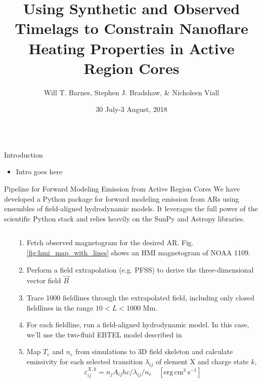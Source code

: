 \documentclass[final,12pt]{beamer}
\title[]{Using Synthetic and Observed Timelags to Constrain Nanoflare\\ Heating Properties in Active Region Cores}
\author[Barnes, Bradshaw, \& Viall]{Will T. Barnes\inst{1}, Stephen J. Bradshaw\inst{1}, \& Nicholeen Viall\inst{2}}
\institute[]{\inst{1} Department of Physics and Astronomy, Rice University \inst{2} NASA Goddard Space Flight Center}
\date{30 July-3 August, 2018}
\begin{document}
\begin{frame}
  \begin{columns}[T]
  \hfill
  \begin{column}{0.49\linewidth}
    \begin{block}{Introduction}
    \begin{itemize}
      \item Intro goes here
    \end{itemize}
    \end{block}
    \begin{block}{Pipeline for Forward Modeling Emission from Active Region Cores}
    We have developed a Python package for forward modeling emission from ARs using ensembles of field-aligned hydrodynamic models. It leverages the full power of the scientific Python stack and relies heavily on the SunPy \citep{sunpy_community_sunpypython_2015} and Astropy \citep{astropy_collaboration_astropy:_2013} libraries.
      \begin{columns}[T]
      \begin{column}{0.39\columnwidth}
      \end{column}
      \begin{column}{0.59\columnwidth}
        \begin{enumerate}
          \item Fetch observed magnetogram for the desired AR. Fig. \ref{fig:hmi_map_with_lines} shows an HMI magnetogram of NOAA 1109. 
          \item Perform a field extrapolation (e.g. PFSS) to derive the three-dimensional vector field $\vec{B}$
          \item Trace 1000 fieldlines through the extrapolated field, including only closed fieldlines in the range $10<L<1000$ Mm.
          \item For each fieldline, run a field-aligned hydrodynamic model. In this case, we'll use the two-fluid EBTEL model described in \citet{barnes_inference_2016}
          \item Map $T_e$ and $n_e$ from simulations to 3D field skeleton and calculate emissivity for each selected transition $\lambda_{ij}$ of element $\mathrm{X}$ and charge state $k$,
            \begin{equation*}
              \varepsilon_{ij}^{X,k} = n_jA_{ij}hc/\lambda_{ij}/n_e \quad [\mathrm{erg}\,\mathrm{cm}^{3}\,\mathrm{s}^{-1}]

\end{equation*}
\end{enumerate}
\end{column}
\end{columns}
\end{block}
\end{column}
\end{columns}
\end{frame}
\end{document}
